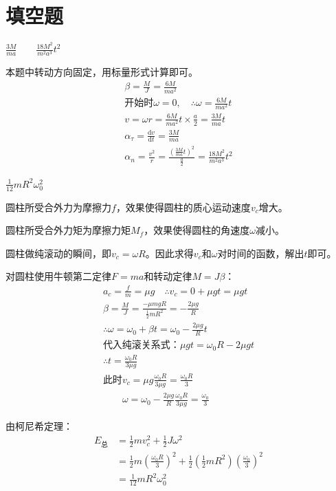 \documentclass[b5paper,opensource,sourcefont,parskip]{qyxf-book}
\newcommand{\di}[1]{\mathrm{d}#1}
\newcommand{\dy}[2]{\frac{\di{#1}}{\di{#2}}}
\begin{document}
\section{填空题}
$\frac{3M}{ma} \hspace{2em} \frac{18M^2}{m^2a^3}t^2$

本题中转动方向固定，用标量形式计算即可。
\begin{gather*}
\beta=\frac{M}{J}=\frac{6M}{ma^2}\\
\text{开始时}\omega=0,\quad\therefore \omega=\frac{6M}{ma^2}t\\
v=\omega r=\frac{6M}{ma^2}t\times\frac{a}{2}=\frac{3M}{ma}t\\
\alpha_{\tau}=\dy{v}{t}=\frac{3M}{ma}\\
\alpha_n=\frac{v^2}{r}=\frac{\left(\frac{3M}{ma}t\right)^2}{\frac{a}{2}}=\frac{18M^2}{m^2a^3}t^2
\end{gather*}

$\frac{1}{12}mR^2\omega_0^2$

圆柱所受合外力为摩擦力$f$，效果使得圆柱的质心运动速度$ v_c $增大。

圆柱所受合外力矩为摩擦力矩$ M_f $，效果使得圆柱的角速度$ \omega $减小。

圆柱做纯滚动的瞬间，即$ v_c=\omega R $。因此求得$ v_c $和$ \omega $对时间的函数，解出$ t $即可。

对圆柱使用牛顿第二定律$F=ma$和转动定律$M=J\beta$：
\begin{gather*}
a_c=\frac{f}{m}=\mu g\quad\therefore v_c=0+\mu gt=\mu gt\\
\beta=\frac{M}{J}=\frac{-\mu mgR}{\frac{1}{2}mR^2}=-\frac{2\mu g}{R}\\
\therefore \omega=\omega_0+\beta t=\omega_0-\frac{2\mu g}{R}t\\
\text{代入纯滚关系式：}\mu gt=\omega_0R-2\mu gt\\
\therefore t=\frac{\omega_0R}{3\mu g}\\
\text{此时}v_c=\mu g\frac{\omega_0R}{3\mu g}=\frac{\omega_0R}{3}\\
\hspace{2em}\omega=\omega_0-\frac{2\mu g}{R}\frac{\omega_0R}{3\mu g}=\frac{\omega_0}{3}
\end{gather*}

由柯尼希定理：
\begin{align*}
E_{\text{总}}&=\frac{1}{2}mv_c^2+\frac{1}{2}J\omega^2\\
&=\frac{1}{2}m\left(\frac{\omega_0R}{3}\right)^2+\frac{1}{2}\left(\frac{1}{2}mR^2\right)\left(\frac{\omega_0}{3}\right)^2\\
&=\frac{1}{12}mR^2\omega_0^2
\end{align*}
\end{document}
